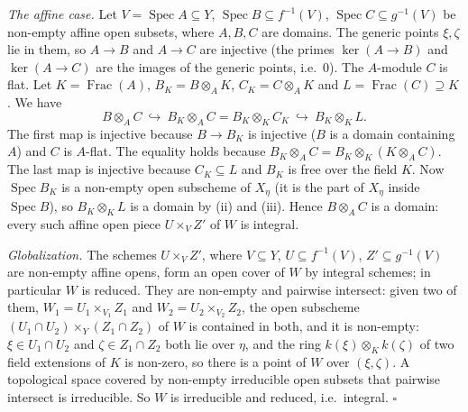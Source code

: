 \documentclass[11pt]{article}
\begin{document}
\emph{The affine case.} Let $V=\operatorname{Spec}A\subseteq Y$, $\operatorname{Spec}B\subseteq f^{-1}(V)$, $\operatorname{Spec}C\subseteq g^{-1}(V)$ be non-empty affine open subsets, where $A,B,C$ are domains. The generic points $\xi,\zeta$ lie in them, so $A\to B$ and $A\to C$ are injective (the primes $\ker(A\to B)$ and $\ker(A\to C)$ are the images of the generic points, i.e.\ $0$). The $A$-module $C$ is flat. Let $K=\operatorname{Frac}(A)$, $B_K=B\otimes_AK$, $C_K=C\otimes_AK$ and $L=\operatorname{Frac}(C)\supseteq K$. We have
\[ B\otimes_AC\ \hookrightarrow\ B_K\otimes_AC=B_K\otimes_K C_K\ \hookrightarrow\ B_K\otimes_KL . \]
The first map is injective because $B\to B_K$ is injective ($B$ is a domain containing $A$) and $C$ is $A$-flat. The equality holds because $B_K\otimes_AC=B_K\otimes_K(K\otimes_AC)$. The last map is injective because $C_K\subseteq L$ and $B_K$ is free over the field $K$. Now $\operatorname{Spec}B_K$ is a non-empty open subscheme of $X_\eta$ (it is the part of $X_\eta$ inside $\operatorname{Spec}B$), so $B_K\otimes_KL$ is a domain by (ii) and (iii). Hence $B\otimes_AC$ is a domain: every such affine open piece $U\times_VZ'$ of $W$ is integral.

\emph{Globalization.} The schemes $U\times_VZ'$, where $V\subseteq Y$, $U\subseteq f^{-1}(V)$, $Z'\subseteq g^{-1}(V)$ are non-empty affine opens, form an open cover of $W$ by integral schemes; in particular $W$ is reduced. They are non-empty and pairwise intersect: given two of them, $W_1=U_1\times_{V_1}Z_1$ and $W_2=U_2\times_{V_2}Z_2$, the open subscheme $(U_1\cap U_2)\times_Y(Z_1\cap Z_2)$ of $W$ is contained in both, and it is non-empty: $\xi\in U_1\cap U_2$ and $\zeta\in Z_1\cap Z_2$ both lie over $\eta$, and the ring $k(\xi)\otimes_Kk(\zeta)$ of two field extensions of $K$ is non-zero, so there is a point of $W$ over $(\xi,\zeta)$. A topological space covered by non-empty irreducible open subsets that pairwise intersect is irreducible. So $W$ is irreducible and reduced, i.e.\ integral. \hfill$\square$
\end{document}
